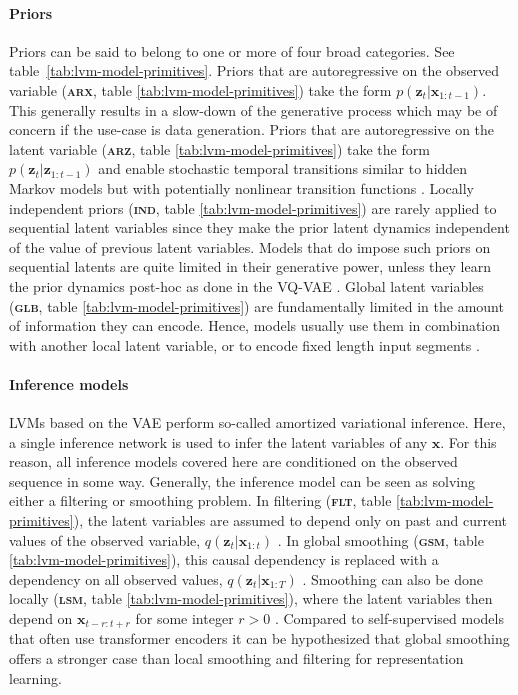 {\paragraph{Priors}
Priors can be said to belong to one or more of four broad categories. See table~\ref{tab:lvm-model-primitives}. 
Priors that are autoregressive on the observed variable (\textbf{\textsc{arx}}, table \ref{tab:lvm-model-primitives}) take the form $p(\mathbf{z}_t|\mathbf{x}_{1:t-1})$. This generally results in a slow-down of the generative process which may be of concern if the use-case is data generation. 
Priors that are autoregressive on the latent variable (\textbf{\textsc{arz}}, table \ref{tab:lvm-model-primitives}) take the form $p(\mathbf{z}_t|\mathbf{z}_{1:t-1})$ and enable stochastic temporal transitions similar to hidden Markov models but with potentially nonlinear transition functions \cite{chung_recurrent_2015, fraccaro_sequential_2016, khurana_factorial_2019, khurana_convolutional_2020}.
Locally independent priors (\textbf{\textsc{ind}}, table \ref{tab:lvm-model-primitives}) are rarely applied to sequential latent variables since they make the prior latent dynamics independent of the value of previous latent variables. Models that do impose such priors on sequential latents are quite limited in their generative power, unless they learn the prior dynamics post-hoc as done in the VQ-VAE \cite{oord_neural_2018}. 
Global latent variables (\textbf{\textsc{glb}}, table \ref{tab:lvm-model-primitives}) are fundamentally limited in the amount of information they can encode. Hence, models usually use them in combination with another local latent variable, or to encode fixed length input segments \cite{khurana_factorial_2019, hsu_learning_2017, hsu_unsupervised_2017}.


\paragraph{Inference models} 
LVMs based on the VAE perform so-called amortized variational inference. Here, a single inference network is used to infer the latent variables of any $\mathbf{x}$. 
For this reason, all inference models covered here are conditioned on the observed sequence in some way. Generally, the inference model can be seen as solving either a filtering or smoothing problem.
In filtering (\textbf{\textsc{flt}}, table \ref{tab:lvm-model-primitives}), the latent variables are assumed to depend only on past and current values of the observed variable, $q(\mathbf{z}_t|\mathbf{x}_{1:t})$ \cite{chung_recurrent_2015, khurana_convolutional_2020}. In global smoothing (\textbf{\textsc{gsm}}, table \ref{tab:lvm-model-primitives}), this causal dependency is replaced with a dependency on all observed values, $q(\mathbf{z}_t|\mathbf{x}_{1:T})$ \cite{fraccaro_sequential_2016, hsu_learning_2017}. 
Smoothing can also be done locally (\textbf{\textsc{lsm}}, table \ref{tab:lvm-model-primitives}), where the latent variables then depend on $\mathbf{x}_{t-r:t+r}$ for some integer $r>0$ \cite{oord_neural_2018}. Compared to self-supervised models that often use transformer encoders it can be hypothesized that global smoothing offers a stronger case than local smoothing and filtering for representation learning.

}
